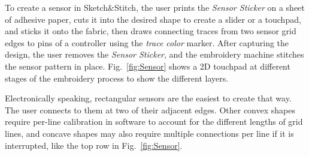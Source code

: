 \documentclass{sigchi}
\begin{document}
To create a sensor in Sketch\&Stitch, the user prints the \textit{Sensor Sticker} on a sheet of adhesive paper, cuts it into the desired shape to create a slider or a touchpad, and sticks it onto the fabric, then draws connecting traces from two sensor grid edges to pins of a controller using the \textit{trace color} marker. After capturing the design, the user removes the \textit{Sensor Sticker}, and the embroidery machine stitches the sensor pattern in place. Fig.\ \ref{fig:Sensor} shows a 2D touchpad at different stages of the embroidery process to show the different layers.

Electronically speaking, rectangular sensors are the easiest to create that way. The user connects to them at two of their adjacent edges. Other convex shapes require per-line calibration in software to account for the different lengths of grid lines, and concave shapes may also require multiple connections per line if it is interrupted, like the top row in Fig.\ \ref{fig:Sensor}.





 
\end{document}
